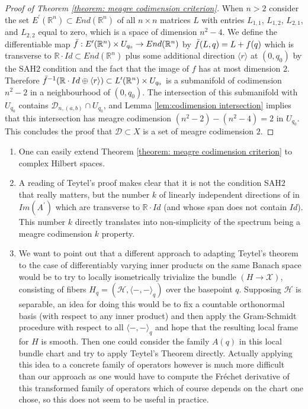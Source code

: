 \begin{proof}[Proof of Theorem \ref{theorem: meagre codimension criterion}]
When $n>2$ consider the set $E^\prime(\mathbb{R}^n)\subset End(\mathbb{R}^n)$ of all $n\times n$ matrices $L$ with entries $L_{1,1}$, $L_{1,2}$, $L_{2,1}$, and $L_{2,2}$ equal to zero, which is a space of dimension $n^2-4$. We define the differentiable map $\Bar{f}:E^\prime (\mathbb{R}^n)\times U_{q_0} \to End(\mathbb{R}^n)$ by $\Bar{f}(L,q)=L+f(q)$ which is transverse to $\mathbb{R}\cdot Id\subset End(\mathbb{R}^n)$ plus some additional direction $\langle r\rangle$ at $(0,q_0)$ by the SAH$2$ condition and the fact that the image of $f$ has at most dimension $2$. Therefore $\Bar{f}^{-1}(\mathbb{R}\cdot Id \oplus \langle r\rangle)\subset L^\prime (\mathbb{R}^n)\times U_{q_0}$ is a submanifold of codimension $n^2-2$ in a neighbourhood of $(0,q_0)$. The intersection of this submanifold with $U_{q_0}$ contains $\mathcal{D}_{n,(a,b)}\cap U_{q_0}$, and Lemma \ref{lem:codimension intersection} implies that this intersection has meagre codimension $(n^2-2)-(n^2-4)=2$ in $U_{q_0}$. This concludes the proof that $\mathcal{D}\subset X$ is a set of meagre codimension $2$.
\end{proof}

\begin{rmk}
\begin{enumerate}
    \item One can easily extend Theorem \ref{theorem: meagre codimension criterion} to complex Hilbert spaces.
    \item A reading of Teytel's proof makes clear that it is not the condition SAH$2$ that really matters, but the number $k$ of linearly independent directions of in $Im(A^\prime)$ which are transverse to $\mathbb{R}\cdot Id$ (and whose span does not contain $Id$). This number $k$ directly translates into non-simplicity of the spectrum being a meagre codimension $k$ property.
    \item We want to point out that a different approach to adapting Teytel's theorem to the case of differentiably varying inner products on the same Banach space would be to try to locally isometrically trivialize the bundle $(H\to \mathcal{X})$, consisting of fibers $H_q=(\mathcal{H},\langle-,-\rangle_{q})$ over the basepoint $q$. Supposing $\mathcal{H}$ is separable, an idea for doing this would be to fix a countable orthonormal basis (with respect to any inner product) and then apply the Gram-Schmidt procedure with respect to all $\langle-,-\rangle_q$ and hope that the resulting local frame for $H$ is smooth. Then one could consider the family $A(q)$ in this local bundle chart and try to apply Teytel's Theorem directly. Actually applying this idea to a concrete family of operators however is much more difficult than our approach as one would have to compute the Fr\'echet derivative of this transformed family of operators which of course depends on the chart one chose, so this does not seem to be useful in practice.
\end{enumerate}
\end{rmk}



